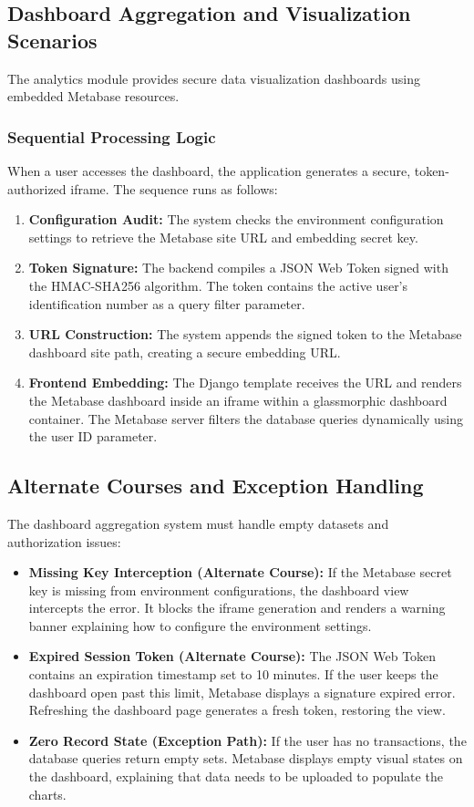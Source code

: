 \subsection{Dashboard Aggregation and Visualization Scenarios}
The analytics module provides secure data visualization dashboards using embedded Metabase resources.
\subsubsection{Sequential Processing Logic}
When a user accesses the dashboard, the application generates a secure, token-authorized iframe. The sequence runs as follows:
\begin{enumerate}
	\item \textbf{Configuration Audit:} The system checks the environment configuration settings to retrieve the Metabase site URL and embedding secret key.
	\item \textbf{Token Signature:} The backend compiles a JSON Web Token signed with the HMAC-SHA256 algorithm. The token contains the active user's identification number as a query filter parameter.
	\item \textbf{URL Construction:} The system appends the signed token to the Metabase dashboard site path, creating a secure embedding URL.
	\item \textbf{Frontend Embedding:} The Django template receives the URL and renders the Metabase dashboard inside an iframe within a glassmorphic dashboard container. The Metabase server filters the database queries dynamically using the user ID parameter.
\end{enumerate}

\subsection{Alternate Courses and Exception Handling}
The dashboard aggregation system must handle empty datasets and authorization issues:
\begin{itemize}
	\item \textbf{Missing Key Interception (Alternate Course):} If the Metabase secret key is missing from environment configurations, the dashboard view intercepts the error. It blocks the iframe generation and renders a warning banner explaining how to configure the environment settings.
	\item \textbf{Expired Session Token (Alternate Course):} The JSON Web Token contains an expiration timestamp set to 10 minutes. If the user keeps the dashboard open past this limit, Metabase displays a signature expired error. Refreshing the dashboard page generates a fresh token, restoring the view.
	\item \textbf{Zero Record State (Exception Path):} If the user has no transactions, the database queries return empty sets. Metabase displays empty visual states on the dashboard, explaining that data needs to be uploaded to populate the charts.
\end{itemize}

